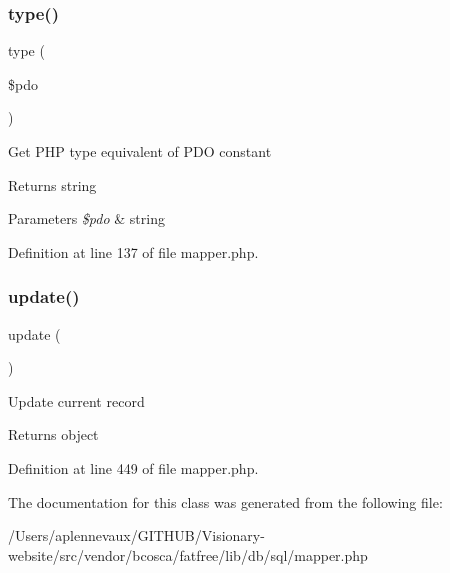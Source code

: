 \subsubsection{\texorpdfstring{type()}{type()}}
{\footnotesize\ttfamily type (\begin{DoxyParamCaption}\item[{}]{\$pdo }\end{DoxyParamCaption})}

Get P\+HP type equivalent of P\+DO constant \begin{DoxyReturn}{Returns}
string 
\end{DoxyReturn}

\begin{DoxyParams}{Parameters}
{\em \$pdo} & string \\
\hline
\end{DoxyParams}


Definition at line 137 of file mapper.\+php.

\hypertarget{class_d_b_1_1_s_q_l_1_1_mapper_a842e4774e3b3601a005b995c02f7e883}{}\label{class_d_b_1_1_s_q_l_1_1_mapper_a842e4774e3b3601a005b995c02f7e883} 
\subsubsection{\texorpdfstring{update()}{update()}}
{\footnotesize\ttfamily update (\begin{DoxyParamCaption}{ }\end{DoxyParamCaption})}

Update current record \begin{DoxyReturn}{Returns}
object 
\end{DoxyReturn}


Definition at line 449 of file mapper.\+php.



The documentation for this class was generated from the following file\+:\begin{DoxyCompactItemize}
\item 
/\+Users/aplennevaux/\+G\+I\+T\+H\+U\+B/\+Visionary-\/website/src/vendor/bcosca/fatfree/lib/db/sql/mapper.\+php\end{DoxyCompactItemize}
